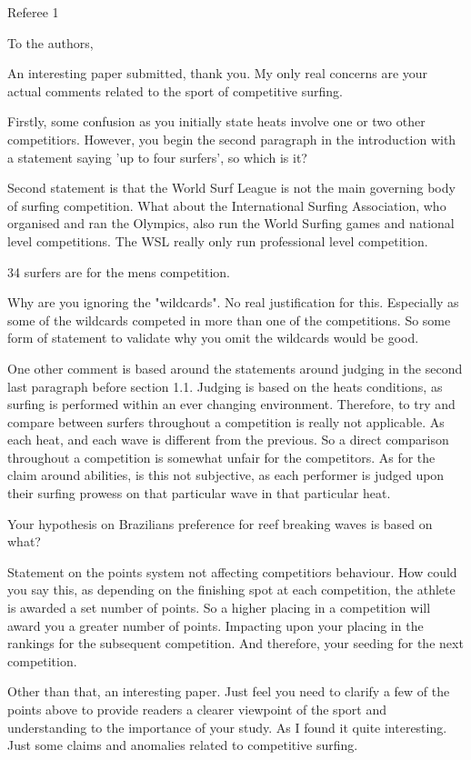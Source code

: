 Referee 1

To the authors,

An interesting paper submitted, thank you. My only
real concerns are your actual comments related to the sport of
competitive surfing.

Firstly, some confusion as you initially state heats involve one or
two other competitiors. However, you begin the second paragraph in the
introduction with a statement saying 'up to four surfers', so which is
it?

Second statement is that the World Surf League is not the main
governing body of surfing competition. What about the International
Surfing Association, who organised and ran the Olympics, also run the
World Surfing games and national level competitions. The WSL really
only run professional level competition.

34 surfers are for the mens competition.

Why are you ignoring the "wildcards". No real justification for
this. Especially as some of the wildcards competed in more than one of
the competitions. So some form of statement to validate why you omit
the wildcards would be good.

One other comment is based around the statements around judging in the
second last paragraph before section 1.1. Judging is based on the
heats conditions, as surfing is performed within an ever changing
environment. Therefore, to try and compare between surfers throughout
a competition is really not applicable. As each heat, and each wave is
different from the previous. So a direct comparison throughout a
competition is somewhat unfair for the competitors. As for the claim
around abilities, is this not subjective, as each performer is judged
upon their surfing prowess on that particular wave in that particular
heat.

Your hypothesis on Brazilians preference for reef breaking waves is based on what? 

Statement on the points system not affecting competitiors
behaviour. How could you say this, as depending on the finishing spot
at each competition, the athlete is awarded a set number of points. So
a higher placing in a competition will award you a greater number of
points. Impacting upon your placing in the rankings for the subsequent
competition. And therefore, your seeding for the next competition.

Other than that, an interesting paper. Just feel you need to clarify a
few of the points above to provide readers a clearer viewpoint of the
sport and understanding to the importance of your study. As I found it
quite interesting. Just some claims and anomalies related to
competitive surfing.
  



